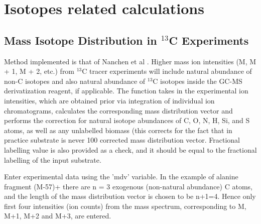 

\chapter{Isotopes related calculations}

\section
{Mass Isotope Distribution in $^{13}$C Experiments}


Method implemented is that of Nanchen et al \cite{nanchen09}. Higher mass ion
intensities (M, M + 1, M + 2, etc.) from $^{13}$C tracer experiments will
include natural abundance of non-C isotopes and also natural abundance of
$^{13}$C isotopes inside the GC-MS derivatization reagent, if applicable. The
function takes in the experimental ion intensities, which are obtained prior via
integration of individual ion chromatograms, calculates the corresponding mass
distribution vector and performs the correction  for natural isotope abundances
of C, O, N, H, Si, and S atoms, as well as any unlabelled biomass (this corrects
for the fact that in practice substrate is never 100%
corrected mass distribution vector. Fractional labelling value is also provided
as a check, and it should be equal to the fractional labelling of the input
substrate.

Enter experimental data using the 'mdv' variable. In the example of
alanine fragment (M-57)+ there are n = 3 exogenous (non-natural
abundance) C atoms, and the length of the mass distribution vector
is chosen to be n+1=4. Hence only first four intensities (ion counts)
from the mass spectrum, corresponding to M, M+1, M+2 and M+3,
are entered.

